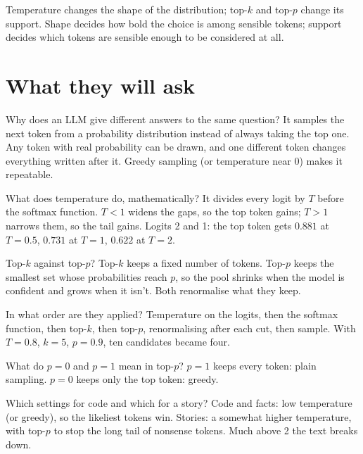 \begin{intuition}
Temperature changes the shape of the distribution; top-$k$ and top-$p$ change its support. Shape decides how bold the choice is among sensible tokens; support decides which tokens are sensible enough to be considered at all.
\end{intuition}

\section{What they will ask}

\begin{iq}[\core]{Why does an LLM give different answers to the same question?}
It samples the next token from a probability distribution instead of always taking the top one. Any token with real probability can be drawn, and one different token changes everything written after it. Greedy sampling (or temperature near 0) makes it repeatable.
\end{iq}

\begin{iq}[\core]{What does temperature do, mathematically?}
It divides every logit by $T$ before the softmax function. $T < 1$ widens the gaps, so the top token gains; $T > 1$ narrows them, so the tail gains. Logits 2 and 1: the top token gets $0.881$ at $T = 0.5$, $0.731$ at $T = 1$, $0.622$ at $T = 2$.
\end{iq}

\begin{iq}[\core]{Top-$k$ against top-$p$?}
Top-$k$ keeps a fixed number of tokens. Top-$p$ keeps the smallest set whose probabilities reach $p$, so the pool shrinks when the model is confident and grows when it isn't. Both renormalise what they keep.
\end{iq}

\begin{iq}{In what order are they applied?}
Temperature on the logits, then the softmax function, then top-$k$, then top-$p$, renormalising after each cut, then sample. With $T = 0.8$, $k = 5$, $p = 0.9$, ten candidates became four.
\end{iq}

\begin{iq}{What do $p = 0$ and $p = 1$ mean in top-$p$?}
$p = 1$ keeps every token: plain sampling. $p = 0$ keeps only the top token: greedy.
\end{iq}

\begin{iq}{Which settings for code and which for a story?}
Code and facts: low temperature (or greedy), so the likeliest tokens win. Stories: a somewhat higher temperature, with top-$p$ to stop the long tail of nonsense tokens. Much above 2 the text breaks down.
\end{iq}
